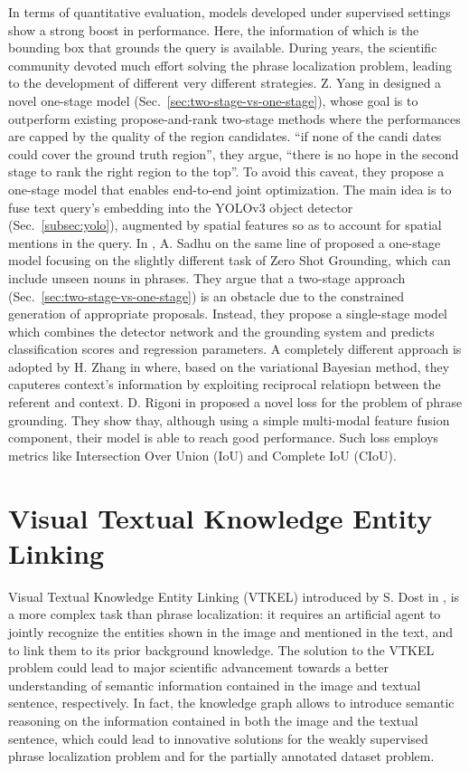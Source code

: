 In terms of quantitative evaluation, models developed under supervised
settings show a strong boost in performance. Here, the information of
which is the bounding box that grounds the query is available. During
years, the scientific community devoted much effort solving the phrase
localization problem, leading to the development of different very
different strategies. Z. Yang \etal{} in \cite{yang2019fast} designed
a novel one-stage model (Sec.~\ref{sec:two-stage-vs-one-stage}), whose
goal is to outperform existing propose-and-rank two-stage methods
where the performances are capped by the quality of the region
candidates. ``if none of the candi dates could cover the ground truth
region'', they argue, ``there is no hope in the second stage to rank
the right region to the top''. To avoid this caveat, they propose a
one-stage model that enables end-to-end joint optimization. The main
idea is to fuse text query's embedding into the YOLOv3 object detector
(Sec.~\ref{subsec:yolo}), augmented by spatial features so as to
account for spatial mentions in the query. In \cite{sadhu2019zero}, A.
Sadhu \etal{} on the same line of \cite{yang2019fast} proposed a
one-stage model focusing on the slightly different task of Zero Shot
Grounding, which can include unseen nouns in phrases. They argue that
a two-stage approach (Sec.~\ref{sec:two-stage-vs-one-stage}) is an
obstacle due to the constrained generation of appropriate proposals.
Instead, they propose a single-stage model which combines the detector
network and the grounding system and predicts classification scores
and regression parameters. A completely different approach is adopted
by H. Zhang \etal{} in \cite{zhang2018grounding} where, based on the
variational Bayesian method, they caputeres context's information by
exploiting reciprocal relatiopn between the referent and context. D.
Rigoni \etal{} in \cite{rigoni2021better} proposed a novel loss for
the problem of phrase grounding. They show thay, although using a
simple multi-modal feature fusion component, their model is able to
reach good performance. Such loss employs metrics like Intersection
Over Union (IoU) and Complete IoU (CIoU).

\section{Visual Textual Knowledge Entity Linking}

Visual Textual Knowledge Entity Linking (VTKEL) introduced by S. Dost
\etal{} in \cite{dost2020jointly, dost2020vtkel, dost2020visual}, is a
more complex task than phrase localization: it requires an artificial
agent to jointly recognize the entities shown in the image and
mentioned in the text, and to link them to its prior background
knowledge. The solution to the VTKEL problem could lead to major
scientific advancement towards a better understanding of semantic
information contained in the image and textual sentence, respectively.
In fact, the knowledge graph allows to introduce semantic reasoning on
the information contained in both the image and the textual sentence,
which could lead to innovative solutions for the weakly supervised
phrase localization problem and for the partially annotated dataset
problem.

